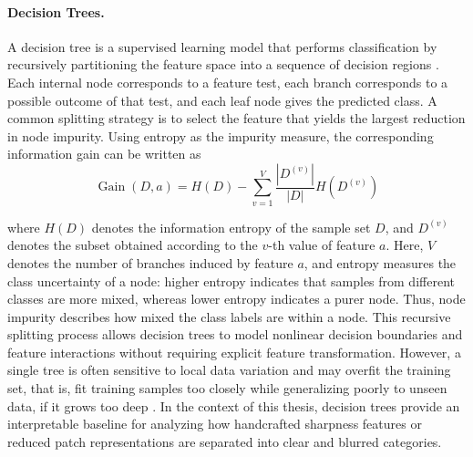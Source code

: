 \paragraph{Decision Trees.} A decision tree is a supervised learning model that
performs classification by recursively partitioning the feature space into a
sequence of decision regions \cite[pp.~18--121]{breiman2017classification}. Each
internal node corresponds to a feature test, each branch corresponds to a
possible outcome of that test, and each leaf node gives the predicted class. A
common splitting strategy is to select the feature that yields the largest
reduction in node impurity. Using entropy as the impurity measure, the
corresponding information gain can be written as
\begin{equation}
    \operatorname{Gain}(D,a)=H(D)-\sum_{v=1}^{V}\frac{|D^{(v)}|}{|D|}H(D^{(v)})
    \label{eq:info-gain-basic}
\end{equation}
\par where $H(D)$ denotes the information entropy of the sample set $D$, and
$D^{(v)}$ denotes the subset obtained according to the $v$-th value of feature
$a$. Here, $V$ denotes the number of branches induced by feature $a$, and
entropy measures the class uncertainty of a node: higher entropy indicates that
samples from different classes are more mixed, whereas lower entropy indicates a
purer node. Thus, node impurity describes how mixed the class labels are within
a node. This recursive splitting process allows decision trees to model
nonlinear decision boundaries and feature interactions without requiring
explicit feature transformation. However, a single tree is often sensitive to
local data variation and may overfit the training set, that is, fit training
samples too closely while generalizing poorly to unseen data, if it grows too
deep \cite[pp.~18--121]{breiman2017classification}. In the context of this
thesis, decision trees provide an interpretable baseline for analyzing how
handcrafted sharpness features or reduced patch representations are separated
into clear and blurred categories.

